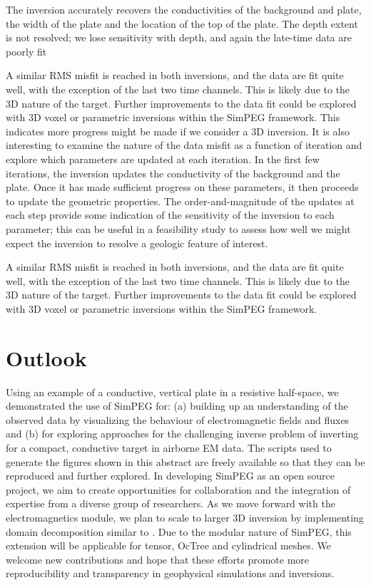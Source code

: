 \documentclass[paper]{geophysics}
\begin{document}
The inversion accurately recovers the conductivities of the background and plate, the width of the plate and the location of the top of the plate. The depth extent is not resolved; we lose sensitivity with depth, and again the late-time data are poorly fit

A similar RMS misfit is reached in both inversions, and the data are fit quite well, with the exception of the last two time channels. This is likely due to the 3D nature of the target. Further improvements to the data fit could be explored with 3D voxel or parametric inversions within the SimPEG framework. This indicates more progress might be made if we consider a 3D inversion. It is also interesting to examine the nature of the data misfit as a function of iteration and explore which parameters are updated at each iteration. In the first few iterations, the inversion updates the conductivity of the background and the plate. Once it has made sufficient progress on these parameters, it then proceeds to update the geometric properties. The order-and-magnitude of the updates at each step provide some indication of the sensitivity of the inversion to each parameter; this can be useful in a feasibility study to assess how well we might expect the inversion to resolve a geologic feature of interest.

A similar RMS misfit is reached in both inversions, and the data are fit quite well, with the exception of the last two time channels. This is likely due to the 3D nature of the target. Further improvements to the data fit could be explored with 3D voxel or parametric inversions within the SimPEG framework.


\section{Outlook}
Using an example of a conductive, vertical plate in a resistive half-space, we demonstrated the use of SimPEG for: (a) building up an understanding of the observed data by visualizing the behaviour of electromagnetic fields and fluxes and (b) for exploring approaches for the challenging inverse problem of inverting for a compact, conductive target in airborne EM data. The scripts used to generate the figures shown in this abstract are freely available so that they can be reproduced and further explored. In developing SimPEG as an open source project, we aim to create opportunities for collaboration and the integration of expertise from a diverse group of researchers. As we move forward with the electromagnetics module, we plan to scale to larger 3D inversion by implementing domain decomposition similar to \cite{yang2014}. Due to the modular nature of SimPEG, this extension will be applicable for tensor, OcTree and cylindrical meshes. We welcome new contributions and hope that these efforts promote more reproducibility and transparency in geophysical simulations and inversions.
\end{document}

